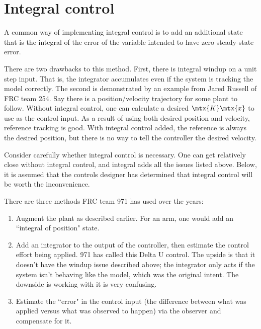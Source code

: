 \section{Integral control}
\label{sec:integral_control}

A common way of implementing integral control is to add an additional
\gls{state} that is the integral of the \gls{error} of the variable intended to
have zero \gls{steady-state error}.

There are two drawbacks to this method. First, there is integral windup on a
unit \gls{step input}. That is, the integrator accumulates even if the
\gls{system} is \gls{tracking} the \gls{model} correctly. The second is
demonstrated by an example from Jared Russell of FRC team 254. Say there is a
position/velocity trajectory for some \gls{plant} to follow. Without integral
control, one can calculate a desired $\mtx{K}\mtx{x}$ to use as the
\gls{control input}. As a result of using both desired position and velocity,
\gls{reference} \gls{tracking} is good. With integral control added, the
\gls{reference} is always the desired position, but there is no way to tell the
controller the desired velocity.

Consider carefully whether integral control is necessary. One can get relatively
close without integral control, and integral adds all the issues listed above.
Below, it is assumed that the controls designer has determined that integral
control will be worth the inconvenience.

There are three methods FRC team 971 has used over the years:

\begin{enumerate}
  \item Augment the \gls{plant} as described earlier. For an arm, one would add
    an ``integral of position" state.
  \item Add an integrator to the output of the controller, then estimate the
    \gls{control effort} being applied. 971 has called this Delta U control. The
    upside is that it doesn't have the windup issue described above; the
    integrator only acts if the \gls{system} isn't behaving like the
    \gls{model}, which was the original intent. The downside is working with it
    is very confusing.
  \item Estimate the ``error" in the \gls{control input} (the difference between
    what was applied versus what was observed to happen) via the \gls{observer}
    and compensate for it.
\end{enumerate}

